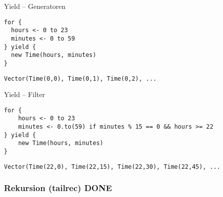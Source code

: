 \documentclass[14pt,aspectratio=169,trans]{beamer} %
\begin{document}
\begin{frame}[fragile]{}
	\begin{block}{Yield -- Generatoren}
		\scriptsize
		\onslide<2->
  \begin{lstlisting}
for {
  hours <- 0 to 23
  minutes <- 0 to 59
} yield {
  new Time(hours, minutes)
}
	\end{lstlisting}
{
\begin{lstlisting}[firstnumber=7]
Vector(Time(0,0), Time(0,1), Time(0,2), ...
\end{lstlisting}
}
	\end{block}
	\note{}
\end{frame}

\begin{frame}[fragile]{}
	\begin{block}{Yield -- Filter}
		\scriptsize
		\onslide<2->
  \begin{lstlisting}
for {
	hours <- 0 to 23
	minutes <- 0.to(59) if minutes % 15 == 0 && hours >= 22
} yield {
	new Time(hours, minutes)
}
	\end{lstlisting}
{
\begin{lstlisting}[firstnumber=7]
Vector(Time(22,0), Time(22,15), Time(22,30), Time(22,45), ...
\end{lstlisting}
}
	\end{block}
	\note{}
\end{frame}



\subsubsection*{Rekursion (tailrec) DONE}
\end{document}
